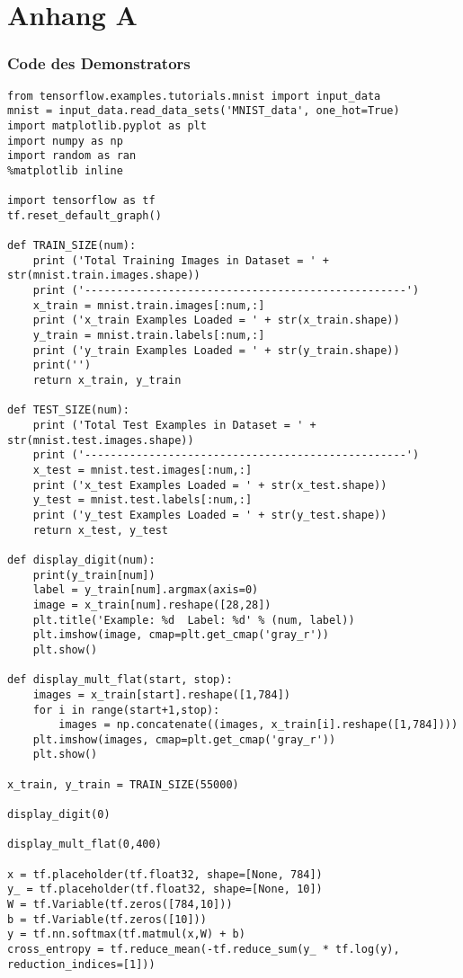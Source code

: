 \chapter{Anhang A}
\label{chap:anhang_a}

\subsection{Code des Demonstrators}
\label{sec:codeDemonstrator}
\begin{lstlisting}
from tensorflow.examples.tutorials.mnist import input_data
mnist = input_data.read_data_sets('MNIST_data', one_hot=True)
import matplotlib.pyplot as plt
import numpy as np
import random as ran
%matplotlib inline

import tensorflow as tf
tf.reset_default_graph()

def TRAIN_SIZE(num):
    print ('Total Training Images in Dataset = ' + str(mnist.train.images.shape))
    print ('--------------------------------------------------')
    x_train = mnist.train.images[:num,:]
    print ('x_train Examples Loaded = ' + str(x_train.shape))
    y_train = mnist.train.labels[:num,:]
    print ('y_train Examples Loaded = ' + str(y_train.shape))
    print('')
    return x_train, y_train

def TEST_SIZE(num):
    print ('Total Test Examples in Dataset = ' + str(mnist.test.images.shape))
    print ('--------------------------------------------------')
    x_test = mnist.test.images[:num,:]
    print ('x_test Examples Loaded = ' + str(x_test.shape))
    y_test = mnist.test.labels[:num,:]
    print ('y_test Examples Loaded = ' + str(y_test.shape))
    return x_test, y_test

def display_digit(num):
    print(y_train[num])
    label = y_train[num].argmax(axis=0)
    image = x_train[num].reshape([28,28])
    plt.title('Example: %d  Label: %d' % (num, label))
    plt.imshow(image, cmap=plt.get_cmap('gray_r'))
    plt.show()
        
def display_mult_flat(start, stop):
    images = x_train[start].reshape([1,784])
    for i in range(start+1,stop):
        images = np.concatenate((images, x_train[i].reshape([1,784])))
    plt.imshow(images, cmap=plt.get_cmap('gray_r'))
    plt.show()
    
x_train, y_train = TRAIN_SIZE(55000)

display_digit(0)

display_mult_flat(0,400)

x = tf.placeholder(tf.float32, shape=[None, 784])
y_ = tf.placeholder(tf.float32, shape=[None, 10])
W = tf.Variable(tf.zeros([784,10]))
b = tf.Variable(tf.zeros([10]))
y = tf.nn.softmax(tf.matmul(x,W) + b)
cross_entropy = tf.reduce_mean(-tf.reduce_sum(y_ * tf.log(y), reduction_indices=[1]))


\end{lstlisting}
